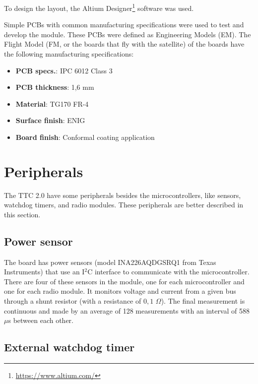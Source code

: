 To design the layout, the Altium Designer\footnote{\href{https://www.altium.com/}{https://www.altium.com/}} software was used.

Simple PCBs with common manufacturing specifications were used to test and develop the module. These PCBs were defined as Engineering Models (EM). The Flight Model (FM, or the boards that fly with the satellite) of the boards have the following manufacturing specifications:

\begin{itemize}
    \item \textbf{PCB specs.}: IPC 6012 Class 3
    \item \textbf{PCB thickness}: 1,6 mm
    \item \textbf{Material}: TG170 FR-4
    \item \textbf{Surface finish}: ENIG
    \item \textbf{Board finish}: Conformal coating application
\end{itemize}

\section{Peripherals}

The TTC 2.0 have some peripherals besides the microcontrollers, like sensors, watchdog timers, and radio modules. These peripherals are better described in this section.

\subsection{Power sensor}

The board has power sensors (model INA226AQDGSRQ1 from Texas Instruments) that use an I$^{2}$C interface to communicate with the microcontroller. There are four of these sensors in the module, one for each microcontroller and one for each radio module. It monitors voltage and current from a given bus through a shunt resistor (with a resistance of $0,1$ $\Omega$). The final measurement is continuous and made by an average of 128 measurements with an interval of 588 $\mu$s between each other.

\subsection{External watchdog timer}

